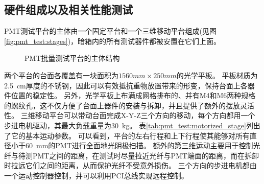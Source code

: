 \subsection{硬件组成以及相关性能测试}
\label{sec:pmt_test:testbench_hardware}
PMT测试平台的主体由一个固定平台和一个三维移动平台组成(见图\ref{fig:pmt_test:stages})，暗箱内的所有测试器件都被安置在它们上面。
\begin{figure}[htbp]
	\centering
	\caption{PMT批量测试平台的主体结构}
	\label{fig:blindfigure}
\end{figure}
两个平台的台面各覆盖有一块面积为$1560mm\times250mm$的光学平板。
平板材质为\SI{2.5}{cm}厚度的不锈钢，因此可以有效抵抗重物放置带来的形变，保持台面上各器件位置的稳定性。
另外，光学平板上布满成网格排布的、并有M4和M6两种规格的螺纹孔，这不仅方便了台面上器件的安装与拆卸，并且提供了额外的摆放灵活性。
三维移动平台可以带动台面完成X-Y-Z三个方向的移动，每个方向都用一个步进电机驱动，其最大负载重量为\SI{30}{\kilo\gram}。
表\ref{tab:pmt_test:motorized_stage}列出了它的基本运动参数。
可以看到，平台的左右行程和上下行程使其能够对所有直径小于\SI{60}{\milli\meter}的PMT进行全面地光阴极扫描。
额外的第三维运动主要用于控制光纤与待测PMT之间的距离，在测试时尽量拉近光纤与PMT端面的距离，而在拆卸时拉远它们之间的距离，从而保护光纤不受意外损伤。
三个方向的步进电机都由一个运动控制器控制\parencite{leetro}，并可以利用PCI总线实现远程控制。
